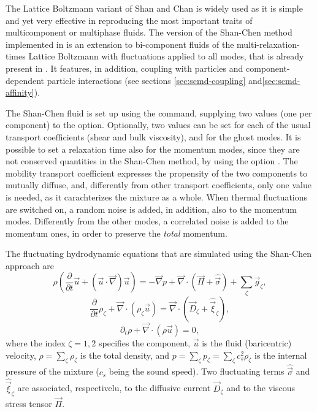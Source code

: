 The Lattice Boltzmann variant of Shan and Chan\cite{shan93a} is widely
used as it is simple and yet very effective in reproducing the most
important traits of multicomponent or multiphase fluids. The version
of the Shan-Chen method implemented in \es is an extension to
bi-component fluids of the multi-relaxation-times Lattice Boltzmann
with fluctuations applied to all modes, that is already present in
\es. It features, in addition, coupling with particles\cite{sega13c}
and component-dependent particle interactions (see sections
\ref{sec:scmd-coupling} and\ref{sec:scmd-affinity}).

The Shan-Chen fluid is set up using the  command,
supplying two values (one per component) to the  option. Optionally, two values can be set for each of the usual transport coefficients  (shear and bulk viscosity), and for the ghost modes. It
is possible to set a relaxation time also for the momentum modes,
since they are not conserved quantities in the Shan-Chen method,
by using the option . The mobility transport coefficient
expresses the propensity of the two components to mutually diffuse,
and, differently from other transport coefficients, only one value
is needed, as it carachterizes the mixture as a whole. When thermal
fluctuations are switched on, a random noise is added, in addition,
also to the momentum modes. Differently from the other modes, a
correlated noise is added to the momentum ones, in order to preserve
the \emph{total} momentum. 


The fluctuating hydrodynamic equations that are simulated using the
Shan-Chen approach are
\begin{equation}\label{eq:shanchen-NS}
\rho \left(\frac{\partial }{\partial  t} {\vec {u}} + ({\vec {u}}\cdot {\vec {\nabla}})  {\vec {u}} \right)=-{\vec {\nabla}} p+{\vec {\nabla}} \cdot ({\vec {\Pi}}+\hat{{\vec {\sigma}}})+\sum_{\zeta} {\vec {g}}_{\zeta},
\end{equation}
\begin{equation}\label{eq:shanchen-cont}
\frac{\partial }{\partial  t} \rho_{\zeta}+{\vec {\nabla}} \cdot (\rho_{\zeta} {\vec {u}}) = {\vec {\nabla}} \cdot  ({\vec {D}}_{\zeta}+\hat{{\vec {\xi}}}_{\zeta}),
\end{equation}
\begin{equation}\label{eq:shanchen-globalcont}
\partial_t \rho+{\vec {\nabla}} \cdot (\rho {\vec {u}}) = 0,
\end{equation}
where the index $\zeta=1,2$ specifies the component, $\vec{u}$ is
the fluid (baricentric) velocity, $\rho=\sum_\zeta\rho_\zeta$ is
the total density, and $p=\sum_{\zeta} p_{\zeta}=\sum_{\zeta} c_s^2
\rho_{\zeta}$ is the internal pressure of the mixture ($c_s$ being
the sound speed). Two fluctuating terms $\hat{{\vec{\sigma}}}$ and
$\hat{{\vec{\xi}}}_{\zeta}$ are associated, respectivelu, to the
diffusive current ${\vec{D}}_{\zeta}$ and to the viscous stress
tensor ${\vec{\Pi}}$.

